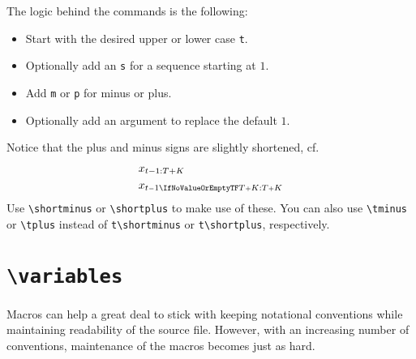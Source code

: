 \documentclass
[
]
{article}
\begin{document}
\newline The logic behind the commands is the following:
\begin{itemize}
	\item Start with the desired upper or lower case \texttt{t}.
	\item Optionally add an \texttt{s} for a sequence starting at $1$.
	\item Add \texttt{m} or \texttt{p} for minus or plus.
	\item Optionally add an argument to replace the default $1$.
\end{itemize}

Notice that the plus and minus signs are slightly shortened, cf.
\begin{align*}
	&x_{t-1:T+K}\\
	&x\tsub{t\shortminus1}{T\shortplus K}
\end{align*}
Use \texttt{\textbackslash shortminus} or \texttt{\textbackslash shortplus} to make use of these.
You can also use \texttt{\textbackslash tminus} or \texttt{\textbackslash tplus} instead of \texttt{t\textbackslash shortminus} or \texttt{t\textbackslash shortplus}, respectively.

\section{\texttt{\textbackslash variables}}
Macros can help a great deal to stick with keeping notational conventions while maintaining readability of the source file. However, with an increasing number of conventions, maintenance of the macros becomes just as hard.
\end{document}
